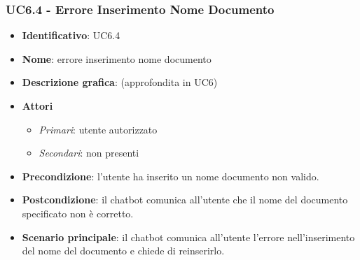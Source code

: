 \subsubsection{UC6.4 - Errore Inserimento Nome Documento}
\begin{itemize}
    \item \textbf{Identificativo}: UC6.4
    \item \textbf{Nome}: errore inserimento nome documento
    \item \textbf{Descrizione grafica}: (approfondita in UC6)
    \item \textbf{Attori}
 \begin{itemize} 
    \item \textit{Primari}: utente autorizzato
    \item \textit{Secondari}: non presenti
 \end{itemize}
 \item \textbf{Precondizione}: l'utente ha inserito un nome documento non valido.
 \item \textbf{Postcondizione}:  il chatbot comunica all'utente che il nome del documento specificato non è corretto.
 \item \textbf{Scenario principale}: il chatbot comunica all'utente l'errore nell'inserimento del nome del documento e chiede di reinserirlo.
\end{itemize}
\newpage